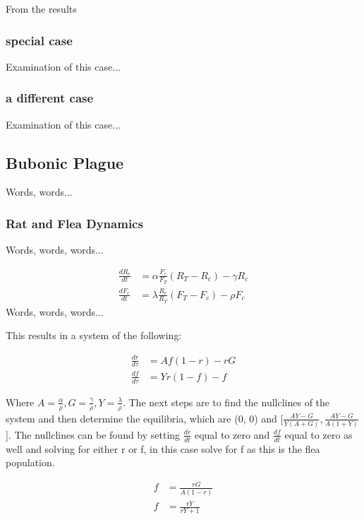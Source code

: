 \documentclass [letterpaper, 12pt] {article}
\begin{document}
From the results 
\pagebreak

\subsubsection{special case}

Examination of this case...


\pagebreak

\subsubsection{a different case}
Examination of this case...

\pagebreak

\subsection {Bubonic Plague}

Words, words...



\subsubsection {Rat and Flea Dynamics}
Words, words, words...


\begin{align}
	\frac{dR_c}{dt} &= \alpha \frac{F_c}{F_T} (R_T-R_c)  - \gamma R_c \\
	\frac{dF_c}{dt} &= \lambda \frac{R_c}{R_T} (F_T-F_c) - \rho F_c 
\end{align}
Words, words, words...


This results in a system of the following:

\begin{align}
	\frac{dr}{d\tau} &= Af(1-r)-rG \\
	\frac{df}{d\tau} &= Yr(1-f)-f
\end{align}

Where $A=\frac{\alpha}{\rho}, G=\frac{\gamma}{\rho},
Y=\frac{\lambda}{\rho}$.
The next steps are to find the nullclines of the system and then determine the equilibria, which are
(0, 0) and [$\frac{AY-G}{Y(A+G)}, \frac{AY-G}{A(1+Y)}$]. The nullclines can be found by setting
$\frac{dr}{dt}$ equal to zero and $\frac{df}{dt}$ equal to zero as well and solving for either r or f,
in this case solve for f as this is the flea population.

\begin{align}
	f &= \frac{rG}{A(1-r)} \\
	f &= \frac{rY}{rY+1}
\end{align}
\end{document}
